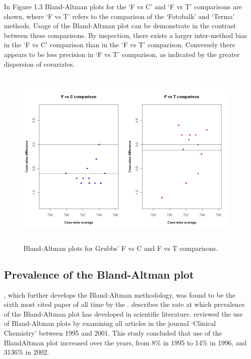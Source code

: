 \documentclass[Chap2main.tex]{subfiles}
\begin{document}
In Figure 1.3 Bland-Altman plots for the `F vs C' and `F vs T'
comparisons are shown, where `F vs T' refers to the comparison of
the `Fotobalk' and `Terma' methods. Usage of the Bland-Altman plot
can be demonstrate in the contrast between these comparisons. By inspection, there exists a larger inter-method bias in the `F vs C' comparison than in the `F vs T' comparison. Conversely there
appears to be less precision in `F vs T' comparison, as indicated
by the greater dispersion of covariates.

\begin{figure}[h!]
	\begin{center}
		\includegraphics[height=90mm]{GrubbsDataTwoBAplots.jpeg}
		\caption{Bland-Altman plots for Grubbs' F vs C and F vs T comparisons.}\label{GrubbsDataTwoBAplots}
	\end{center}
\end{figure}

\newpage

\subsection{Prevalence of the Bland-Altman plot}
\citet*{BA86}, which further develops the Bland-Altman methodology,
was found to be the sixth most cited paper of all time by the
\citet{BAcite}. \cite{Dewitte} describes the rate at which
prevalence of the Bland-Altman plot has developed in scientific
literature. \citet{Dewitte} reviewed the use of Bland-Altman plots
by examining all articles in the journal `Clinical Chemistry'
between 1995 and 2001. This study concluded that use of the
BlandAltman plot increased over the years, from 8\% in 1995 to
14\% in 1996, and 3136\% in 2002.
\end{document}
